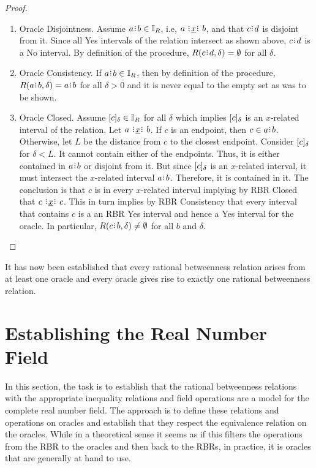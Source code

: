 \documentclass[12pt]{article}
\begin{document}
\begin{proof}
\begin{enumerate}
        \item Oracle Disjointness. Assume $a\rint b \in \mathbb{I}_R$, i.e, $a \xrel b$, and that $c\rint d$ is disjoint from it. Since all Yes intervals of the relation intersect as shown above, $c\rint d$ is a No interval. By definition of the procedure, $R(c\rint d, \delta) = \emptyset$ for all $\delta$. 
        \item Oracle Consistency. If $a\rint b \in \mathbb{I}_R$, then by definition of the procedure, $R(a\rint b, \delta) = a\rint b$ for all $\delta >0$ and it is never equal to the empty set as was to be shown. 
        \item Oracle Closed. Assume $[c]_{\delta} \in \mathbb{I}_R$ for all $\delta$ which implies $[c]_{\delta}$ is an $x$-related interval of the relation. Let $a \xrel b$. If $c$ is an endpoint, then $c \in a\rint b$. Otherwise, let $L$ be the distance from $c$ to the closest endpoint. Consider $[c]_{\delta}$ for $\delta < L$. It cannot contain either of the endpoints. Thus, it is either contained in $a\rint b$ or disjoint from it. But since $[c]_{\delta}$ is an $x$-related interval, it must intersect the $x$-related interval $a\rint b$. Therefore, it is contained in it. The conclusion is that $c$ is in every $x$-related interval implying by RBR Closed that $c \xrel c$. This in turn implies by RBR Consistency that every interval that contains $c$ is a an RBR Yes interval and hence a Yes interval for the oracle. In particular, $R(c\rint b, \delta) \neq \emptyset$ for all $b$ and $\delta$. 
    \end{enumerate}
\end{proof}


It has now been established that every rational betweenness relation arises from at least one oracle and every oracle gives rise to exactly one rational betweenness relation. 




\section{Establishing the Real Number Field}

In this section, the task is to establish that the rational betweenness relations with the appropriate inequality relations and field operations are a model for the complete real number field. The approach is to define these relations and operations on oracles and establish that they respect the equivalence relation on the oracles. While in a theoretical sense it seems as if this filters the operations from the RBR to the oracles and then back to the RBRs, in practice, it is oracles that are generally at hand to use. 
\end{document}
